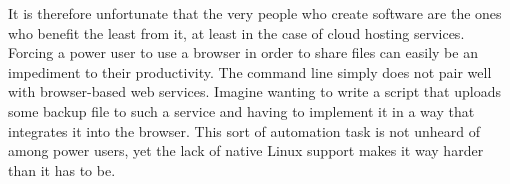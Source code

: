 It is therefore unfortunate that the very people who create software are the ones who benefit the least from it, at least in the case of cloud hosting services. Forcing a power user to use a browser in order to share files can easily be an impediment to their productivity. The command line simply does not pair well with browser-based web services. Imagine wanting to write a script that uploads some backup file to such a service and having to implement it in a way that integrates it into the browser. This sort of automation task is not unheard of among power users, yet the lack of native Linux support makes it way harder than it has to be.
